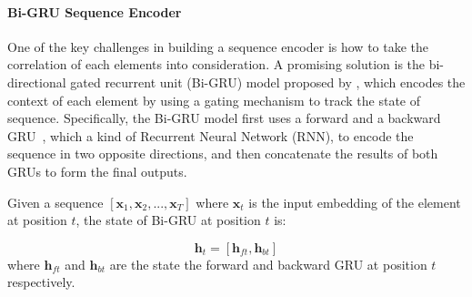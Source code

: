 \paragraph{Bi-GRU Sequence Encoder} 
One of the key challenges in building a sequence encoder is how to take the correlation of each elements into consideration. A promising solution is the bi-directional gated recurrent unit (Bi-GRU) model proposed by \cite{bahdanau2015neural}, which encodes the context of each element by using a gating mechanism to track the state of sequence.
Specifically, the Bi-GRU model first uses a forward and a backward GRU~\cite{cho2014learning}, which a kind of Recurrent Neural Network (RNN), to encode the sequence in two opposite directions, and then concatenate the results of both GRUs to form the final outputs. 

Given a sequence $[\mathbf{x}_1, \mathbf{x}_2, ..., \mathbf{x}_T]$ where $\mathbf{x}_t$ is the input embedding of the element at position $t$, the state of Bi-GRU at position $t$ is:

\begin{equation}
\mathbf{h}_t = [\mathbf{h}_{ft}, \mathbf{h}_{bt}]
\end{equation}
where $\mathbf{h}_{ft}$ and $\mathbf{h}_{bt}$ are the state the forward and backward GRU at position $t$ respectively. 





